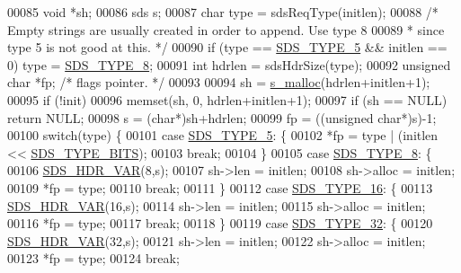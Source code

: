 \begin{DoxyCode}
00085     \textcolor{keywordtype}{void} *sh;
00086     sds s;
00087     \textcolor{keywordtype}{char} type = sdsReqType(initlen);
00088     \textcolor{comment}{/* Empty strings are usually created in order to append. Use type 8}
00089 \textcolor{comment}{     * since type 5 is not good at this. */}
00090     \textcolor{keywordflow}{if} (type == \hyperlink{sds_8h_a3b7b67f1efa75f6b78ae18ea853b1a91}{SDS\_TYPE\_5} && initlen == 0) type = \hyperlink{sds_8h_a504136356f04bfa2fd616dd4c8fdd71c}{SDS\_TYPE\_8};
00091     \textcolor{keywordtype}{int} hdrlen = sdsHdrSize(type);
00092     \textcolor{keywordtype}{unsigned} \textcolor{keywordtype}{char} *fp; \textcolor{comment}{/* flags pointer. */}
00093 
00094     sh = \hyperlink{sdsalloc_8h_a41e8c1188dca30db85c410c25fb417b6}{s\_malloc}(hdrlen+initlen+1);
00095     \textcolor{keywordflow}{if} (!init)
00096         memset(sh, 0, hdrlen+initlen+1);
00097     \textcolor{keywordflow}{if} (sh == NULL) \textcolor{keywordflow}{return} NULL;
00098     s = (\textcolor{keywordtype}{char}*)sh+hdrlen;
00099     fp = ((\textcolor{keywordtype}{unsigned} \textcolor{keywordtype}{char}*)s)-1;
00100     \textcolor{keywordflow}{switch}(type) \{
00101         \textcolor{keywordflow}{case} \hyperlink{sds_8h_a3b7b67f1efa75f6b78ae18ea853b1a91}{SDS\_TYPE\_5}: \{
00102             *fp = type | (initlen << \hyperlink{sds_8h_aab3be62faa5a2354242a1c1036450a40}{SDS\_TYPE\_BITS});
00103             \textcolor{keywordflow}{break};
00104         \}
00105         \textcolor{keywordflow}{case} \hyperlink{sds_8h_a504136356f04bfa2fd616dd4c8fdd71c}{SDS\_TYPE\_8}: \{
00106             \hyperlink{sds_8h_a79b76920d1d9bc010926b7af167de89b}{SDS\_HDR\_VAR}(8,s);
00107             sh->len = initlen;
00108             sh->alloc = initlen;
00109             *fp = type;
00110             \textcolor{keywordflow}{break};
00111         \}
00112         \textcolor{keywordflow}{case} \hyperlink{sds_8h_aa54044bf70a30824caeb1bab3615bff2}{SDS\_TYPE\_16}: \{
00113             \hyperlink{sds_8h_a79b76920d1d9bc010926b7af167de89b}{SDS\_HDR\_VAR}(16,s);
00114             sh->len = initlen;
00115             sh->alloc = initlen;
00116             *fp = type;
00117             \textcolor{keywordflow}{break};
00118         \}
00119         \textcolor{keywordflow}{case} \hyperlink{sds_8h_a0ad2103bbdaa2fe5511ce3279cb42293}{SDS\_TYPE\_32}: \{
00120             \hyperlink{sds_8h_a79b76920d1d9bc010926b7af167de89b}{SDS\_HDR\_VAR}(32,s);
00121             sh->len = initlen;
00122             sh->alloc = initlen;
00123             *fp = type;
00124             \textcolor{keywordflow}{break};

\end{DoxyCode}
